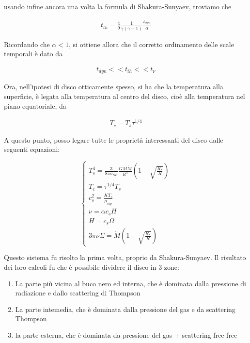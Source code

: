 \documentclass{report}
\begin{document}
usando infine ancora una volta la formula di Shakura-Sunyaev, troviamo che 

\begin{align}
    t_{th} = \frac{4}{9}\frac{1}{\gamma(\gamma -1)}\frac{t_{dyn}}{\alpha}
\end{align}

Ricordando che \(\alpha < 1\), si ottiene allora che il corretto ordinamento delle scale temporali è dato da 

\begin{align}
    t_{dyn} << t_{th} << t_{\nu}
\end{align}

Ora, nell'ipotesi di disco otticamente spesso, si ha che la temperatura alla superficie, è legata alla temperatura al centro del disco, cioè alla temperatura nel piano equatoriale, da 

\begin{align}
    T_c = T_s \tau^{1/4}
\end{align}

A questo punto, posso legare tutte le proprietà interessanti del disco dalle seguenti equazioni: 

\[
\begin{cases}
    T_s^4 = \frac{3}{8\pi\sigma_{SB}}\frac{GM\dot{M}}{R^3}\left( 1 - \sqrt{\frac{R_*}{R}}\right) \\
    T_c = \tau^{1/4}T_s \\
    c_s^2 = \frac{KT_c}{\mu_{mp}}\\
    \nu = \alpha c_s H \\
    H = c_s\Omega \\
    3\pi \nu \Sigma = \dot{M}\left(1 - \sqrt{\frac{R_*}{R}}\right) 
\end{cases}
\]

Questo sistema fu risolto la prima volta, proprio da Shakura-Sunyaev. Il risultato dei loro calcoli fu che è possibile dividere il disco in 3 zone: 

\begin{enumerate}
    \item La parte più vicina al buco nero ed interna, che è dominata dalla pressione di radiazione e dallo scattering di Thompson 
    \item La parte intemedia, che è dominata dalla pressione del gas e da scattering Thompson 
    \item la parte esterna, che è dominata da pressione del gas + scattering free-free
\end{enumerate}
\end{document}
